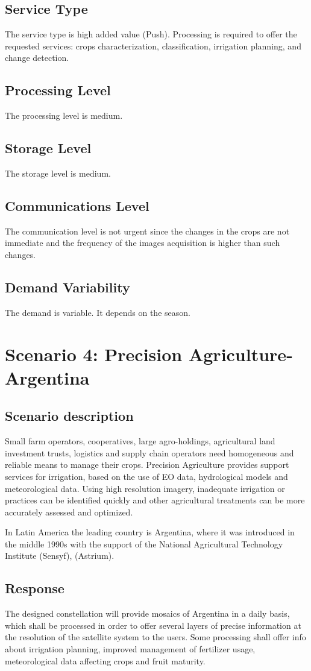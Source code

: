 \subsection{Service Type}
The service type is high added value (Push). Processing is required to offer the requested services: crops characterization, classification, irrigation planning, and change detection.
\subsection{Processing Level}
The processing level is medium.
\subsection{Storage Level}
The storage level is medium.
\subsection{Communications Level}
The communication level is not urgent since the changes in the crops are not immediate and the frequency of the images acquisition is higher than such changes. 
\subsection{Demand Variability}
The demand is variable. It depends on the season.

\section{Scenario 4: Precision Agriculture-Argentina}
\subsection{Scenario description}
Small farm operators, cooperatives, large agro-holdings, agricultural land
investment trusts, logistics and supply chain operators need homogeneous and
reliable means to manage their crops. Precision Agriculture provides support
services for irrigation, based on the use of \acl{EO} data, hydrological models and meteorological data. Using high resolution imagery, inadequate irrigation or practices can be identified quickly and other agricultural treatments can be more accurately assessed and optimized.

In Latin America the leading country is Argentina, where it was introduced in the middle 1990s with the support of the National Agricultural Technology Institute (Sensyf), (Astrium).
\subsection{Response}
The designed constellation will provide mosaics of Argentina in a daily basis, which shall be processed in order to offer several layers of precise information at the resolution of the satellite system to the users.
Some processing shall offer info about irrigation planning, improved management of fertilizer usage, meteorological data affecting crops and fruit maturity.
